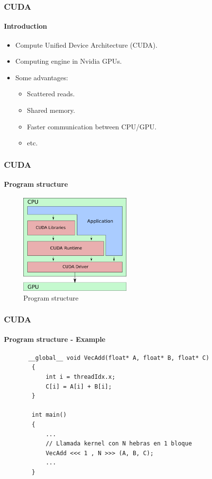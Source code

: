 \begin{frame}
    \frametitle{CUDA}
    \framesubtitle{Introduction}
    \begin{itemize}
        \item Compute Unified Device Architecture (CUDA).
        \item Computing engine in Nvidia GPUs.
        \item Some advantages:
        \begin{itemize}
            \item Scattered reads.
            \item Shared memory.
            \item Faster communication between CPU/GPU.
            \item etc.
        \end{itemize}
    \end{itemize}
\end{frame}

\begin{frame}
    \frametitle{CUDA}
    \framesubtitle{Program structure}
    \begin{figure}
        \centering
        \label{fig:cuda-structure}
        \includegraphics[width=0.5\textwidth]{img/cuda-structure}
        \caption{Program structure}
    \end{figure}
\end{frame}

\begin{frame}[fragile]
    \frametitle{CUDA}
    \framesubtitle{Program structure - Example}
    \begin{lstlisting}
       __global__ void VecAdd(float* A, float* B, float* C)
        {
            int i = threadIdx.x;
            C[i] = A[i] + B[i];
        }

        int main()
        {
            ...
            // Llamada kernel con N hebras en 1 bloque
            VecAdd <<< 1 , N >>> (A, B, C);
            ...
        }
    \end{lstlisting}
\end{frame}



